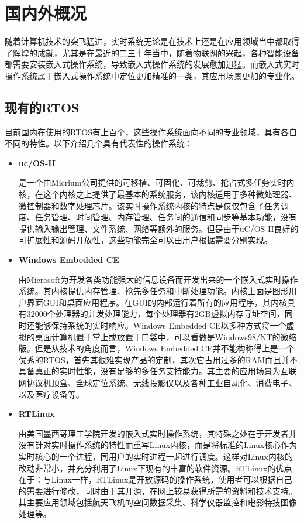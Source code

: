 \section{国内外概况}
	随着计算机技术的突飞猛进，实时系统无论是在技术上还是在应用领域当中都取得了辉煌的成就，尤其是在最近的二三十年当中，随着物联网的兴起，各种智能设备都需要安装嵌入式操作系统，导致嵌入式操作系统的发展愈加迅猛。而嵌入式实时操作系统属于嵌入式操作系统中定位更加精准的一类，其应用场景更加的专业化。
	
\subsection{现有的RTOS}
	目前国内在使用的RTOS有上百个，这些操作系统面向不同的专业领域，具有各自不同的特性。以下介绍几个具有代表性的操作系统：
\begin{itemize}
\item \textbf{uc/OS-II}
	
	是一个由Micrium公司提供的可移植、可固化、可裁剪、抢占式多任务实时内核，在这个内核之上提供了最基本的系统服务，该内核适用于多种微处理器、微控制器和数字处理芯片。该实时操作系统内核的特点是仅仅包含了任务调度、任务管理、时间管理、内存管理、任务间的通信和同步等基本功能，没有提供输入输出管理、文件系统、网络等额外的服务。但是由于uC/OS-II良好的可扩展性和源码开放性，这些功能完全可以由用户根据需要分别实现。
	
\item \textbf{Windows Embedded CE}

	由Microsoft为开发各类功能强大的信息设备而开发出来的一个嵌入式实时操作系统。其内核提供内存管理、抢先多任务和中断处理功能。内核上面是图形用户界面GUI和桌面应用程序。在GUI的内部运行着所有的应用程序，其内核具有32000个处理器的并发处理能力，每个处理器有2GB虚拟内存寻址空间，同时还能够保持系统的实时响应\cite{WindowsEmbeddedCE6.0}。Windows Embedded CE以多种方式将一个虚拟的桌面计算机置于掌上或放置于口袋中，可以看做是Windows98/NT的微缩版。但是从技术的角度而言，Windows Embedded CE并不能构称得上是一个优秀的RTOS，首先其很难实现产品的定制，其次它占用过多的RAM而且并不具备真正的实时性能，没有足够的多任务支持能力。其主要的应用场景为互联网协议机顶盒、全球定位系统、无线投影仪以及各种工业自动化、消费电子、以及医疗设备等。
	
\item \textbf{RTLinux}
	
	由美国墨西哥理工学院开发的嵌入式实时操作系统，其特殊之处在于开发者并没有针对实时操作系统的特性而重写Linux内核，而是将标准的Linux核心作为实时核心的一个进程，同用户的实时进程一起进行调度。这样对Linux内核的改动非常小，并充分利用了Linux下现有的丰富的软件资源。RTLinux的优点在于：与Linux一样，RTLinux是开放源码的操作系统，使用者可以根据自己的需要进行修改，同时由于其开源，在网上较易获得所需的资料和技术支持。其主要应用领域包括航天飞机的空间数据采集、科学仪器监控和电影特技图像处理等。
	

\end{itemize}
